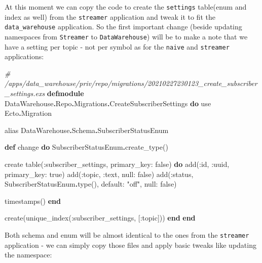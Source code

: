 \documentclass[
]{book}
\newenvironment{Shaded}{\begin{snugshade}}{\end{snugshade}}
\newcommand{\CommentTok}[1]{\textcolor[rgb]{0.56,0.35,0.01}{\textit{#1}}}
\newcommand{\ConstantTok}[1]{\textcolor[rgb]{0.00,0.00,0.00}{#1}}
\newcommand{\ImportTok}[1]{#1}
\newcommand{\KeywordTok}[1]{\textcolor[rgb]{0.13,0.29,0.53}{\textbf{#1}}}
\newcommand{\NormalTok}[1]{#1}
\newcommand{\OperatorTok}[1]{\textcolor[rgb]{0.81,0.36,0.00}{\textbf{#1}}}
\newcommand{\StringTok}[1]{\textcolor[rgb]{0.31,0.60,0.02}{#1}}
\newcommand{\VariableTok}[1]{\textcolor[rgb]{0.00,0.00,0.00}{#1}}
\begin{document}
At this moment we can copy the code to create the \texttt{settings} table(enum and index as well) from the \texttt{streamer} application and tweak it to fit the \texttt{data\_warehouse} application. So the first important change (beside updating namespaces from \texttt{Streamer} to \texttt{DataWarehouse}) will be to make a note that we have a setting per topic - not per symbol as for the \texttt{naive} and \texttt{streamer} applications:

\begin{Shaded}
\begin{Highlighting}[]
\CommentTok{\# /apps/data\_warehouse/priv/repo/migrations/20210227230123\_create\_subscriber\_settings.exs}
\KeywordTok{defmodule} \ConstantTok{DataWarehouse}\OperatorTok{.}\ConstantTok{Repo}\OperatorTok{.}\ConstantTok{Migrations}\OperatorTok{.}\ConstantTok{CreateSubscriberSettings} \KeywordTok{do}
  \ImportTok{use} \ConstantTok{Ecto}\OperatorTok{.}\ConstantTok{Migration}

  \ImportTok{alias} \ConstantTok{DataWarehouse}\OperatorTok{.}\ConstantTok{Schema}\OperatorTok{.}\ConstantTok{SubscriberStatusEnum}

  \KeywordTok{def}\NormalTok{ change }\KeywordTok{do}
    \ConstantTok{SubscriberStatusEnum}\OperatorTok{.}\NormalTok{create\_type()}

\NormalTok{    create table(}\VariableTok{:subscriber\_settings}\NormalTok{, }\VariableTok{primary\_key:} \ConstantTok{false}\NormalTok{) }\KeywordTok{do}
\NormalTok{      add(}\VariableTok{:id}\NormalTok{, }\VariableTok{:uuid}\NormalTok{, }\VariableTok{primary\_key:} \ConstantTok{true}\NormalTok{)}
\NormalTok{      add(}\VariableTok{:topic}\NormalTok{, }\VariableTok{:text}\NormalTok{, }\VariableTok{null:} \ConstantTok{false}\NormalTok{)}
\NormalTok{      add(}\VariableTok{:status}\NormalTok{, }\ConstantTok{SubscriberStatusEnum}\OperatorTok{.}\NormalTok{type(), }\VariableTok{default:} \StringTok{"off"}\NormalTok{, }\VariableTok{null:} \ConstantTok{false}\NormalTok{)}
      
\NormalTok{      timestamps()}
    \KeywordTok{end}

\NormalTok{    create(unique\_index(}\VariableTok{:subscriber\_settings}\NormalTok{, [}\VariableTok{:topic}\NormalTok{]))}
  \KeywordTok{end}
\KeywordTok{end}
\end{Highlighting}
\end{Shaded}

Both schema and enum will be almost identical to the ones from the \texttt{streamer} application - we can simply copy those files and apply basic tweaks like updating the namespace:
\end{document}

